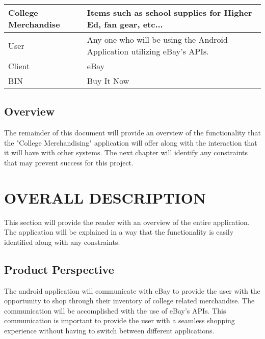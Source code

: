 \documentclass[journal,compsoc, 10pt, draftclsnofoot, onecolumn]{IEEEtran}
\begin{document}
\begin{table}[]
\begin{tabularx}{\textwidth}{X|X}
College Merchandise     & Items such as school supplies for Higher Ed, fan gear, etc...                                                                 \\ \hline
User                   	      & Any one who will be using the Android Application utilizing eBay's APIs.                                                      \\ \hline
Client                 	      & eBay                                                                                                                          \\ \hline
BIN                    	      & Buy It Now                                                                                                                    \\ \hline
\end{tabularx}
\end{table}

\subsection{Overview}

The remainder of this document will provide an overview of the functionality 
that the "College Merchandising" application will offer along with the 
interaction that it will have with other systems. The next chapter will identify
 any constraints that may prevent success for this project.

\section{OVERALL DESCRIPTION}

This section will provide the reader with an overview of the entire application.
 The application will be explained in a way that the functionality is easily 
identified along with any constraints.

\subsection{Product Perspective}

The android application will communicate with eBay to provide the user with the 
opportunity to shop through their inventory of college related merchandise. The 
communication will be accomplished with the use of eBay's APIs. This 
communication is important to provide the user with a seamless shopping 
experience without having to switch between different applications.\newline
\end{document}
